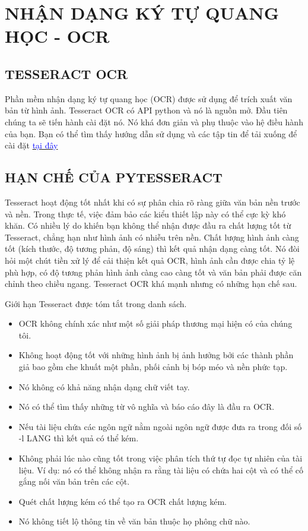 \documentclass{article}
\begin{document}
\section{NHẬN DẠNG KÝ TỰ QUANG HỌC - OCR}
\subsection{TESSERACT OCR}
Phần mềm nhận dạng ký tự quang học (OCR) được sử dụng để trích xuất văn bản từ hình ảnh. Tesseract OCR có API python và nó là nguồn mở. Đầu tiên chúng ta sẽ tiến hành cài đặt nó. Nó khá đơn giản và phụ thuộc vào hệ điều hành của bạn. Bạn có thể tìm thấy hướng dẫn sử dụng và các tập tin để tải xuống để cài đặt
\href{https://guides.library.illinois.edu/c.php?g=347520&p=4121425.}{\textcolor{blue}{tại đây}}
\subsection{HẠN CHẾ CỦA PYTESSERACT}
Tesseract hoạt động tốt nhất khi có sự phân chia rõ ràng giữa văn bản nền trước và nền. Trong thực tế, việc đảm bảo các kiểu thiết lập này có thể cực kỳ khó khăn. Có nhiều lý do khiến bạn không thể nhận được đầu ra chất lượng tốt từ Tesseract, chẳng hạn như hình ảnh có nhiễu trên nền. Chất lượng hình ảnh càng tốt (kích thước, độ tương phản, độ sáng) thì kết quả nhận dạng càng tốt. Nó đòi hỏi một chút tiền xử lý để cải thiện kết quả OCR, hình ảnh cần được chia tỷ lệ phù hợp, có độ tương phản hình ảnh càng cao càng tốt và văn bản phải được căn chỉnh theo chiều ngang. Tesseract OCR khá mạnh nhưng có những hạn chế sau.

Giới hạn Tesseract được tóm tắt trong danh sách.
\begin{itemize}

\item OCR không chính xác như một số giải pháp thương mại hiện có của chúng tôi.

\item Không hoạt động tốt với những hình ảnh bị ảnh hưởng bởi các thành phần giả bao gồm che khuất một phần, phối cảnh bị bóp méo và nền phức tạp.

\item Nó không có khả năng nhận dạng chữ viết tay.
\item Nó có thể tìm thấy những từ vô nghĩa và báo cáo đây là đầu ra OCR.
\item Nếu tài liệu chứa các ngôn ngữ nằm ngoài ngôn ngữ được đưa ra trong đối số -l LANG thì kết quả có thể kém.

\item Không phải lúc nào cũng tốt trong việc phân tích thứ tự đọc tự nhiên của tài liệu. Ví dụ: nó có thể không nhận ra rằng tài liệu có chứa hai cột và có thể cố gắng nối văn bản trên các cột.

\item Quét chất lượng kém có thể tạo ra OCR chất lượng kém.
\item Nó không tiết lộ thông tin về văn bản thuộc họ phông chữ nào.

\end{itemize}
\end{document}
